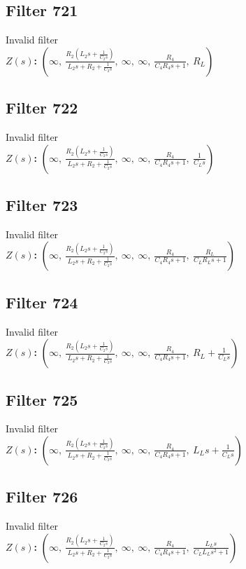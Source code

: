 \documentclass{article}
\begin{document}
\subsection*{Filter 721}
Invalid filter \\ 
\textbf{$Z(s)$:} $\left( \infty, \  \frac{R_{2} \left(L_{2} s + \frac{1}{C_{2} s}\right)}{L_{2} s + R_{2} + \frac{1}{C_{2} s}}, \  \infty, \  \infty, \  \frac{R_{4}}{C_{4} R_{4} s + 1}, \  R_{L}\right)$ \\ 
\subsection*{Filter 722}
Invalid filter \\ 
\textbf{$Z(s)$:} $\left( \infty, \  \frac{R_{2} \left(L_{2} s + \frac{1}{C_{2} s}\right)}{L_{2} s + R_{2} + \frac{1}{C_{2} s}}, \  \infty, \  \infty, \  \frac{R_{4}}{C_{4} R_{4} s + 1}, \  \frac{1}{C_{L} s}\right)$ \\ 
\subsection*{Filter 723}
Invalid filter \\ 
\textbf{$Z(s)$:} $\left( \infty, \  \frac{R_{2} \left(L_{2} s + \frac{1}{C_{2} s}\right)}{L_{2} s + R_{2} + \frac{1}{C_{2} s}}, \  \infty, \  \infty, \  \frac{R_{4}}{C_{4} R_{4} s + 1}, \  \frac{R_{L}}{C_{L} R_{L} s + 1}\right)$ \\ 
\subsection*{Filter 724}
Invalid filter \\ 
\textbf{$Z(s)$:} $\left( \infty, \  \frac{R_{2} \left(L_{2} s + \frac{1}{C_{2} s}\right)}{L_{2} s + R_{2} + \frac{1}{C_{2} s}}, \  \infty, \  \infty, \  \frac{R_{4}}{C_{4} R_{4} s + 1}, \  R_{L} + \frac{1}{C_{L} s}\right)$ \\ 
\subsection*{Filter 725}
Invalid filter \\ 
\textbf{$Z(s)$:} $\left( \infty, \  \frac{R_{2} \left(L_{2} s + \frac{1}{C_{2} s}\right)}{L_{2} s + R_{2} + \frac{1}{C_{2} s}}, \  \infty, \  \infty, \  \frac{R_{4}}{C_{4} R_{4} s + 1}, \  L_{L} s + \frac{1}{C_{L} s}\right)$ \\ 
\subsection*{Filter 726}
Invalid filter \\ 
\textbf{$Z(s)$:} $\left( \infty, \  \frac{R_{2} \left(L_{2} s + \frac{1}{C_{2} s}\right)}{L_{2} s + R_{2} + \frac{1}{C_{2} s}}, \  \infty, \  \infty, \  \frac{R_{4}}{C_{4} R_{4} s + 1}, \  \frac{L_{L} s}{C_{L} L_{L} s^{2} + 1}\right)$ \\ 
\end{document}
